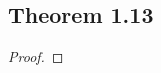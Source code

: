 \documentclass[../../main.tex]{subfiles}
\begin{document}
\subsection{Theorem 1.13}
\begin{wts}

\end{wts}
\begin{proof}

\end{proof}
\end{document}

